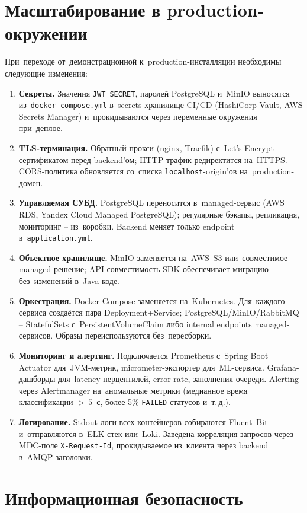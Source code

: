 \documentclass[a4paper,12pt]{diplom}
\begin{document}
\section{Масштабирование в production-окружении}
\label{sec:production}

При~переходе от~демонстрационной к~production-инсталляции необходимы следующие изменения:

\begin{enumerate}[label=\arabic{enumi})]
\item \textbf{Секреты.} Значения \verb|JWT_SECRET|, паролей PostgreSQL и~MinIO выносятся из~\verb|docker-compose.yml| в~secrets-хранилище CI/CD (HashiCorp Vault, AWS Secrets Manager) и~прокидываются через переменные окружения при~деплое.
\item \textbf{TLS-терминация.} Обратный прокси (nginx, Traefik) с~Let's Encrypt-сертификатом перед backend'ом; HTTP-трафик редиректится на~HTTPS. CORS-политика обновляется со~списка \verb|localhost|-origin'ов на~production-домен.
\item \textbf{Управляемая СУБД.} PostgreSQL переносится в~managed-сервис (AWS RDS, Yandex Cloud Managed PostgreSQL); регулярные бэкапы, репликация, мониторинг -- из~коробки. Backend меняет только endpoint в~\verb|application.yml|.
\item \textbf{Объектное хранилище.} MinIO заменяется на~AWS~S3 или~совместимое managed-решение; API-совместимость SDK обеспечивает миграцию без~изменений в~Java-коде.
\item \textbf{Оркестрация.} Docker Compose заменяется на~Kubernetes. Для~каждого сервиса создаётся пара Deployment+Service; PostgreSQL/MinIO/RabbitMQ -- StatefulSets с~PersistentVolumeClaim либо internal endpoints managed-сервисов. Образы переиспользуются без~пересборки.
\item \textbf{Мониторинг и алертинг.} Подключается Prometheus с~Spring Boot Actuator для~JVM-метрик, micrometer-экспортер для~ML-сервиса. Grafana-дашборды для~latency перцентилей, error rate, заполнения очереди. Alerting через Alertmanager на~аномальные метрики (медианное время классификации $>\,5$~с, более 5\% \texttt{FAILED}-статусов и~т.\,д.).
\item \textbf{Логирование.} Stdout-логи всех контейнеров собираются Fluent~Bit и~отправляются в~ELK-стек или~Loki. Заведена корреляция запросов через MDC-поле \verb|X-Request-Id|, прокидываемое из~клиента через backend в~AMQP-заголовки.
\end{enumerate}

\section{Информационная безопасность}
\label{sec:security}
\end{document}
